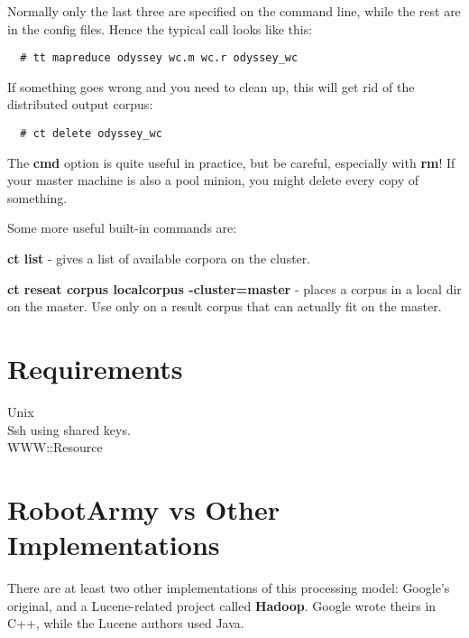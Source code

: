 \documentclass{tufte-handout}
\begin{document}
Normally only the last three are specified on the command line, while the rest are in the config files. Hence the typical call looks like this:

\begin{verbatim}
  # tt mapreduce odyssey wc.m wc.r odyssey_wc
\end{verbatim}


If something goes wrong and you need to clean up, this will get rid of the distributed output corpus:

\begin{verbatim}
  # ct delete odyssey_wc
\end{verbatim}


The \textbf{cmd} option is quite useful in practice, but be careful, especially with \textbf{rm}! If your master machine is also a pool minion, you might delete every copy of something.



Some more useful built-in commands are:



\textbf{ct list} - gives a list of available corpora on the cluster.



\textbf{ct reseat corpus localcorpus -cluster=master} - places a corpus in a local dir on the master. Use only on a result corpus that can actually fit on the master.

\section{Requirements\label{Requirements}}
\begin{description}

\item[{Unix}] \mbox{}
\item[{Ssh using shared keys.}] \mbox{}
\item[{WWW::Resource}] \mbox{}\end{description}
\section{RobotArmy vs Other Implementations\label{RobotArmy_vs_Other_Implementations}}


There are at least two other implementations of this processing model: Google's original, and a Lucene-related project called \textbf{Hadoop}. Google wrote theirs in C++, while the Lucene authors used Java.
\end{document}
